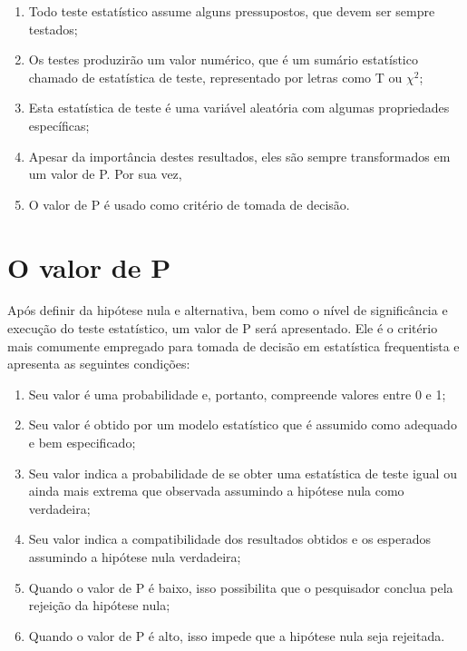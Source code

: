 \documentclass[
]{book}
\providecommand{\tightlist}{%
  \setlength{\itemsep}{0pt}\setlength{\parskip}{0pt}}
\begin{document}
\begin{enumerate}
\def\labelenumi{(\arabic{enumi})}
\tightlist
\item
  Todo teste estatístico assume alguns pressupostos, que devem ser sempre testados;\\
\item
  Os testes produzirão um valor numérico, que é um sumário estatístico chamado de estatística de teste, representado por letras como T ou \(\chi^2\);\\
\item
  Esta estatística de teste é uma variável aleatória com algumas propriedades específicas;\\
\item
  Apesar da importância destes resultados, eles são sempre transformados em um valor de P. Por sua vez,\\
\item
  O valor de P é usado como critério de tomada de decisão.
\end{enumerate}

\hypertarget{o-valor-de-p}{%
\section{O valor de P}\label{o-valor-de-p}}

Após definir da hipótese nula e alternativa, bem como o nível de significância e execução do teste estatístico, um valor de P será apresentado. Ele é o critério mais comumente empregado para tomada de decisão em estatística frequentista e apresenta as seguintes condições:

\begin{enumerate}
\def\labelenumi{(\arabic{enumi})}
\tightlist
\item
  Seu valor é uma probabilidade e, portanto, compreende valores entre 0 e 1;\\
\item
  Seu valor é obtido por um modelo estatístico que é assumido como adequado e bem especificado;\\
\item
  Seu valor indica a probabilidade de se obter uma estatística de teste igual ou ainda mais extrema que observada assumindo a hipótese nula como verdadeira;\\
\item
  Seu valor indica a compatibilidade dos resultados obtidos e os esperados assumindo a hipótese nula verdadeira;\\
\item
  Quando o valor de P é baixo, isso possibilita que o pesquisador conclua pela rejeição da hipótese nula;\\
\item
  Quando o valor de P é alto, isso impede que a hipótese nula seja rejeitada.
\end{enumerate}
\end{document}
